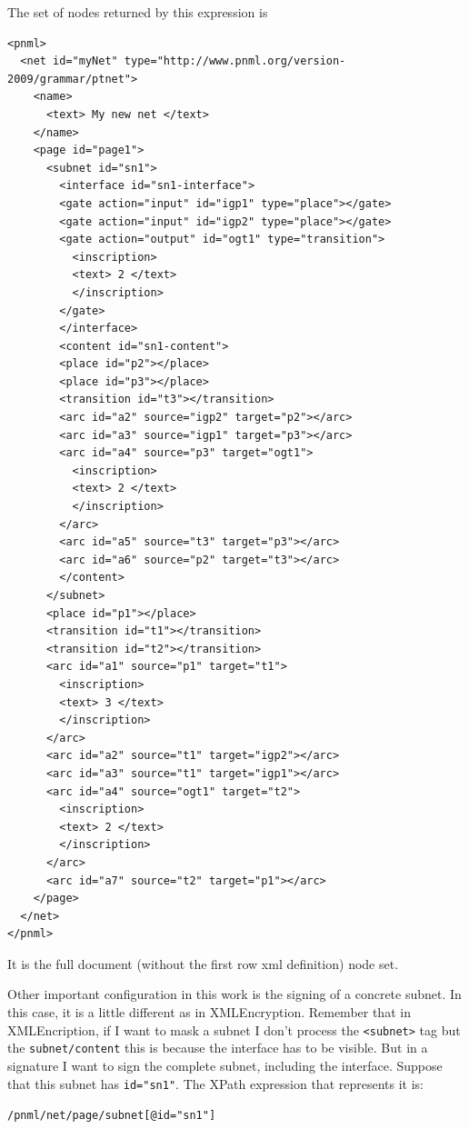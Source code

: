 The set of nodes returned by this expression is

\begin{lstlisting}
<pnml>
  <net id="myNet" type="http://www.pnml.org/version-2009/grammar/ptnet">
    <name>
      <text> My new net </text>
    </name>
    <page id="page1">
      <subnet id="sn1">
        <interface id="sn1-interface">
        <gate action="input" id="igp1" type="place"></gate>
        <gate action="input" id="igp2" type="place"></gate>
        <gate action="output" id="ogt1" type="transition">
          <inscription>
          <text> 2 </text>
          </inscription>
        </gate>
        </interface>
        <content id="sn1-content">
        <place id="p2"></place>
        <place id="p3"></place>
        <transition id="t3"></transition>
        <arc id="a2" source="igp2" target="p2"></arc>
        <arc id="a3" source="igp1" target="p3"></arc>
        <arc id="a4" source="p3" target="ogt1">
          <inscription>
          <text> 2 </text>
          </inscription>
        </arc>
        <arc id="a5" source="t3" target="p3"></arc>
        <arc id="a6" source="p2" target="t3"></arc>
        </content>
      </subnet>
      <place id="p1"></place>
      <transition id="t1"></transition>
      <transition id="t2"></transition>
      <arc id="a1" source="p1" target="t1">
        <inscription>
        <text> 3 </text>
        </inscription>
      </arc>
      <arc id="a2" source="t1" target="igp2"></arc>
      <arc id="a3" source="t1" target="igp1"></arc>
      <arc id="a4" source="ogt1" target="t2">
        <inscription>
        <text> 2 </text>
        </inscription>
      </arc>
      <arc id="a7" source="t2" target="p1"></arc>
    </page>
  </net>
</pnml> 
\end{lstlisting}

It is the full document (without the first row xml definition) node set.

Other important configuration in this work is the signing of a concrete subnet. In this case, it is a little different as in XMLEncryption. Remember that in XMLEncription, if I want to mask a subnet I don't process the \texttt{<subnet>} tag
but the \texttt{subnet/content} this is because the interface has to be visible.
But in a signature I want to sign the complete subnet, including the interface.
Suppose that this subnet has \texttt{id="sn1"}. The XPath expression that
represents it is:
\begin{alltt}
    /pnml/net/page/subnet[@id="sn1"]
\end{alltt} 


